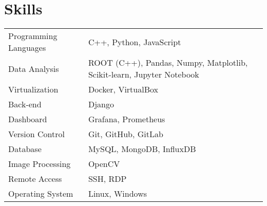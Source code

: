 \documentclass[a4paper,12pt]{article}
\begin{document}

\section{Skills}
\begin{tabularx}{\linewidth}{@{}l X@{}}
Programming Languages &  \normalsize{C++, Python, JavaScript}\\
Data Analysis & \normalsize{ROOT (C++), Pandas, Numpy, Matplotlib, Scikit-learn, Jupyter Notebook}\\
Virtualization & \normalsize{Docker, VirtualBox}\\
Back-end & \normalsize{Django}\\
Dashboard & \normalsize{Grafana, Prometheus}\\
Version Control & \normalsize{Git, GitHub, GitLab}\\
Database & \normalsize{MySQL, MongoDB, InfluxDB}\\
Image Processing & \normalsize{OpenCV}\\
Remote Access & \normalsize{SSH, RDP}\\
Operating System & \normalsize{Linux, Windows}\\
\end{tabularx}
\end{document}
